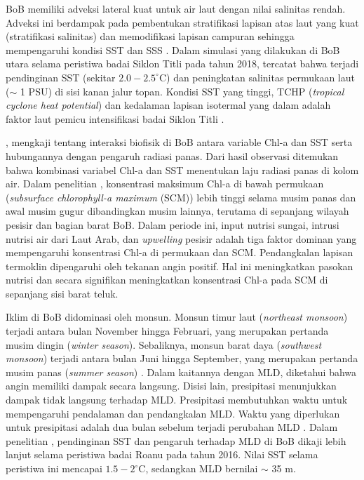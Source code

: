 \begin{spacing}{1.5}
	BoB memiliki adveksi lateral kuat untuk air laut dengan nilai salinitas rendah. Adveksi ini berdampak pada pembentukan stratifikasi lapisan atas laut yang kuat (stratifikasi salinitas) dan memodifikasi lapisan campuran sehingga mempengaruhi kondisi SST dan SSS . Dalam simulasi yang dilakukan di BoB utara selama peristiwa badai Siklon Titli pada tahun 2018, tercatat bahwa terjadi pendinginan SST (sekitar $2.0 - 2.5^\circ$C) dan peningkatan salinitas permukaan laut ($\sim$ 1 PSU) di sisi kanan jalur topan. Kondisi SST yang tinggi, TCHP (\textit{tropical cyclone heat potential}) dan kedalaman lapisan isotermal yang dalam adalah faktor laut pemicu intensifikasi badai Siklon Titli . 
	
	, mengkaji tentang interaksi biofisik di BoB antara variable Chl-a dan SST serta hubungannya dengan pengaruh radiasi panas. Dari hasil observasi ditemukan bahwa kombinasi variabel Chl-a dan SST menentukan laju radiasi panas di kolom air. Dalam penelitian , konsentrasi maksimum Chl-a di bawah permukaan (\textit{subsurface chlorophyll-a maximum} (SCM)) lebih tinggi selama musim panas dan awal musim gugur dibandingkan musim lainnya, terutama di sepanjang wilayah pesisir dan bagian barat BoB. Dalam periode ini, input nutrisi sungai, intrusi nutrisi air dari Laut Arab, dan \textit{upwelling} pesisir adalah tiga faktor dominan yang mempengaruhi konsentrasi Chl-a di permukaan dan SCM. Pendangkalan lapisan termoklin dipengaruhi oleh tekanan angin positif. Hal ini meningkatkan pasokan nutrisi dan secara signifikan meningkatkan konsentrasi Chl-a pada SCM di sepanjang sisi barat teluk.
	
	Iklim di BoB didominasi oleh monsun. Monsun timur laut (\textit{northeast monsoon}) terjadi antara bulan November hingga Februari, yang merupakan pertanda musim dingin (\textit{winter season}). Sebaliknya, monsun barat daya (\textit{southwest monsoon}) terjadi antara bulan Juni hingga September, yang merupakan pertanda musim panas (\textit{summer season}) . Dalam kaitannya dengan MLD, diketahui bahwa angin memiliki dampak secara langsung. Disisi lain, presipitasi menunjukkan dampak tidak langsung terhadap MLD. Presipitasi membutuhkan waktu untuk mempengaruhi pendalaman dan pendangkalan MLD. Waktu yang diperlukan untuk presipitasi adalah dua bulan sebelum terjadi perubahan MLD . Dalam penelitian , pendinginan SST dan pengaruh terhadap MLD di BoB dikaji lebih lanjut selama peristiwa badai Roanu pada tahun 2016. Nilai SST selama peristiwa ini mencapai $1.5-2^\circ$C, sedangkan MLD bernilai $\sim$ 35 m. 
	

\end{spacing}
